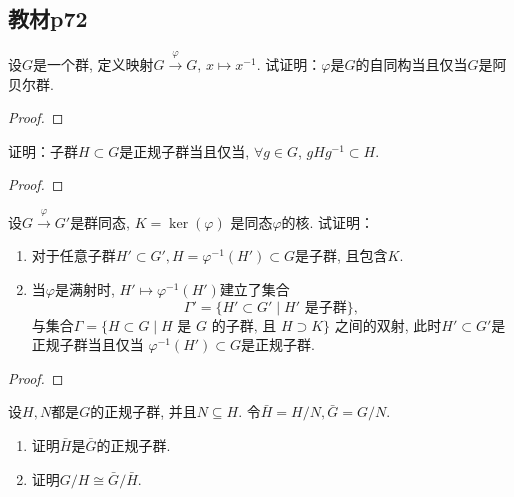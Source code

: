 \subsection{教材p72}

\begin{problem}
    设$G$是一个群, 定义映射$G \xrightarrow\varphi G,\, x \mapsto x^{-1}$.
试证明：$\varphi$是$G$的自同构当且仅当$G$是阿贝尔群.
\end{problem}

\begin{proof}
    
\end{proof}

\begin{problem}
    证明：子群$H \subset G$是正规子群当且仅当,
$\forall g \in G$, $gHg^{-1} \subset H$.
\end{problem}

\begin{proof}
    
\end{proof}

\begin{problem}
    设$G \xrightarrow\varphi G'$是群同态, $K = \ker(\varphi)$
是同态$\varphi$的核. 试证明：
\begin{enumerate}[(1)]
    \item 对于任意子群$H' \subset G', H = \varphi^{-1}(H') \subset G$是子群, 且包含$K$.
    \item 当$\varphi$是满射时, $H' \mapsto \varphi^{-1}(H')$建立了集合
\[
    \Gamma'=\{H' \subset G' \mid H' \text{ 是子群}\},
\]
与集合$\Gamma = \{H \subset G \mid H \text{ 是 }G \text{ 的子群, 且 } H \supset K\}$
之间的双射, 此时$H' \subset G'$是正规子群当且仅当
$\varphi^{-1}(H') \subset G$是正规子群.
\end{enumerate}
\end{problem}

\begin{proof}
    
\end{proof}

\begin{problem}
    设$H, N$都是$G$的正规子群, 并且$N \subseteq H$.
令$\bar{H} = H/N, \bar{G} = G/N$.
\begin{enumerate}[(1)]
    \item 证明$\bar{H}$是$\bar{G}$的正规子群.
    \item 证明$G/H \cong \bar{G}/\bar{H}$.
\end{enumerate}
\end{problem}

